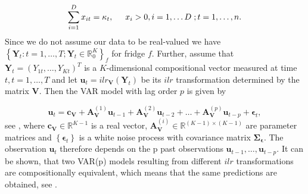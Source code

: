 \begin{equation}
\sum_{i=1}^D x_{it} = \kappa_t, \hspace{0.5cm} x_i > 0, i=1,\ldots D \hspace{0.1cm}; t=1,\ldots, n. 
\label{eq:CTS characterisation}
\end{equation} 
%
Since we do not assume our data to be real-valued we have $\left\{\bm{Y}_t:t=1,\ldots,T; \bm{Y}_t \in \mathbb{R}_0^K \right\}_f$ for fridge $f$. Further, assume that $\bm{Y}_t=(Y_{1t},\ldots,Y_{Kt})^T$ is a $K$-dimensional compositional vector measured at time $t, t=1,\ldots,T$ and let $\textbf{u}_t = ilr_{\bm{V}}(\bm{Y}_t)$ be its $ilr$ transformation determined by the matrix $\textbf{V}$. Then the VAR model with lag order $p$ is given by

\begin{equation}
\textbf{u}_t = \textbf{c}_{\textbf{V}} + \textbf{A}_{\textbf{V}}^{(1)}\textbf{u}_{t-1} + \textbf{A}_{\textbf{V}}^{(2)}\textbf{u}_{t-2} + \ldots + \textbf{A}_{\textbf{V}}^{(p)}\textbf{u}_{t-p} + \bm{\epsilon}_{t},
\label{eq:VAR model}
\end{equation}
%
see \textcite{Kynclova:2015}, where $\textbf{c}_{\textbf{V}} \in \mathbb{R}^{K-1}$ is a real vector, $\textbf{A}_{\textbf{V}}^{(i)} \in \mathbb{R}^{(K-1) \times (K-1)}$ are parameter matrices and $\left\{\bm{\epsilon}_t\right\}$ is a white noise process with covariance matrix $\bm{\Sigma_\epsilon}$. The observation $\textbf{u}_t$ therefore depends on the p past observations $\textbf{u}_{t-1},\ldots,\textbf{u}_{t-p}$. It can be shown, that two VAR(p) models resulting from different $ilr$ transformations are compositionally equivalent, which means that the same predictions are obtained, see \textcite{Kynclova:2015}. 



